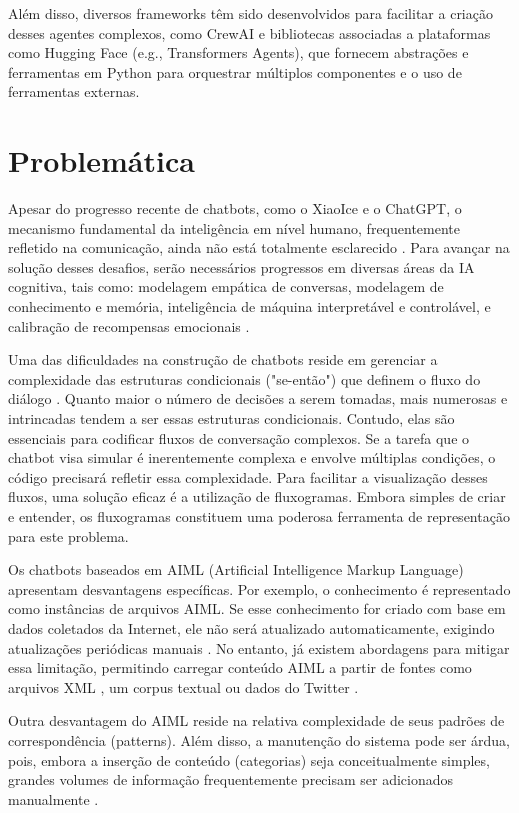 \documentclass[a4paper,oneside]{book}
\begin{document}
Além disso, diversos frameworks têm sido desenvolvidos para facilitar a criação desses agentes complexos, como CrewAI e bibliotecas associadas a plataformas como Hugging Face (e.g., Transformers Agents), que fornecem abstrações e ferramentas em Python para orquestrar múltiplos componentes e o uso de ferramentas externas.

\section{Problemática}	

Apesar do progresso recente de chatbots, como o XiaoIce e o ChatGPT, o mecanismo fundamental da inteligência em nível humano, frequentemente refletido na comunicação, ainda não está totalmente esclarecido \cite{Shum2018}. Para avançar na solução desses desafios, serão necessários progressos em diversas áreas da IA cognitiva, tais como: modelagem empática de conversas, modelagem de conhecimento e memória, inteligência de máquina interpretável e controlável, e calibração de recompensas emocionais \cite{Shum2018}.

Uma das dificuldades na construção de chatbots reside em gerenciar a complexidade das estruturas condicionais ("se-então") que definem o fluxo do diálogo \cite{Raj2019}. Quanto maior o número de decisões a serem tomadas, mais numerosas e intrincadas tendem a ser essas estruturas condicionais. Contudo, elas são essenciais para codificar fluxos de conversação complexos. Se a tarefa que o chatbot visa simular é inerentemente complexa e envolve múltiplas condições, o código precisará refletir essa complexidade. Para facilitar a visualização desses fluxos, uma solução eficaz é a utilização de fluxogramas. Embora simples de criar e entender, os fluxogramas constituem uma poderosa ferramenta de representação para este problema.

Os chatbots baseados em AIML (Artificial Intelligence Markup Language) apresentam desvantagens específicas. Por exemplo, o conhecimento é representado como instâncias de arquivos AIML. Se esse conhecimento for criado com base em dados coletados da Internet, ele não será atualizado automaticamente, exigindo atualizações periódicas manuais \cite{Madhumitha2015}. No entanto, já existem abordagens para mitigar essa limitação, permitindo carregar conteúdo AIML a partir de fontes como arquivos XML \cite{Macedo2014}, um corpus textual \cite{DeGasperis2013} ou dados do Twitter \cite{Yamaguchi2018}.

Outra desvantagem do AIML reside na relativa complexidade de seus padrões de correspondência (patterns). Além disso, a manutenção do sistema pode ser árdua, pois, embora a inserção de conteúdo (categorias) seja conceitualmente simples, grandes volumes de informação frequentemente precisam ser adicionados manualmente \cite{Madhumitha2015}.
\end{document}
